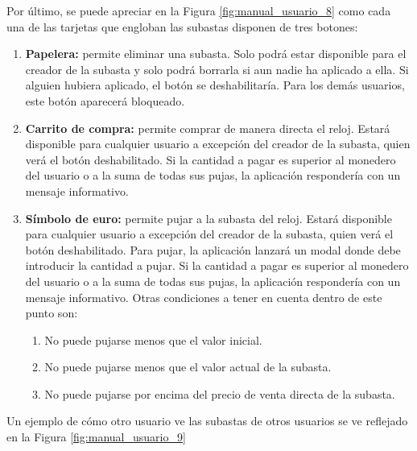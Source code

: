 	Por último, se puede apreciar en la Figura \ref{fig:manual_usuario_8} como cada una de las tarjetas que engloban las subastas disponen de tres botones:
	\begin{enumerate}
		\item \textbf{Papelera:} permite eliminar una subasta. Solo podrá estar disponible para el creador de la subasta y solo podrá borrarla si aun nadie ha aplicado a ella. Si alguien hubiera aplicado, el botón se deshabilitaría. Para los demás usuarios, este botón aparecerá bloqueado.
		\item \textbf{Carrito de compra:} permite comprar de manera directa el reloj. Estará disponible para cualquier usuario a excepción del creador de la subasta, quien verá el botón deshabilitado. Si la cantidad a pagar es superior al monedero del usuario o a la suma de todas sus pujas, la aplicación respondería con un mensaje informativo.
		\item \textbf{Símbolo de euro:} permite pujar a la subasta del reloj. Estará disponible para cualquier usuario a excepción del creador de la subasta, quien verá el botón deshabilitado. Para pujar, la aplicación lanzará un modal donde debe introducir la cantidad a pujar. Si la cantidad a pagar es superior al monedero del usuario o a la suma de todas sus pujas, la aplicación respondería con un mensaje informativo. Otras condiciones a tener en cuenta dentro de este punto son:
		\begin{enumerate}
			\item No puede pujarse menos que el valor inicial.
			\item No puede pujarse menos que el valor actual de la subasta.
			\item No puede pujarse por encima del precio de venta directa de la subasta.
		\end{enumerate}
	\end{enumerate}
	
	Un ejemplo de cómo otro usuario ve las subastas de otros usuarios se ve reflejado en la Figura \ref{fig:manual_usuario_9}
	



